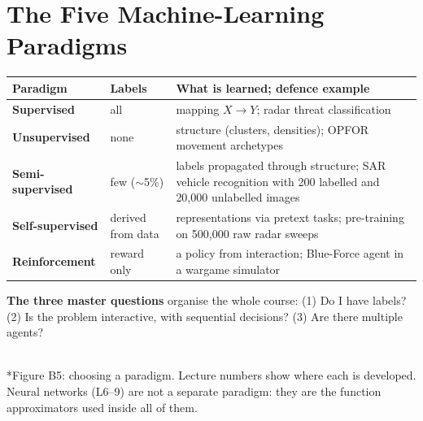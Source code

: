 \documentclass[11pt]{article}
\begin{document}
\section{The Five Machine-Learning Paradigms}
\begin{center}\small\renewcommand{\arraystretch}{1.3}
\begin{tabularx}{\textwidth}{>{\bfseries}l l X}\toprule Paradigm & Labels & What is learned; defence example\\\midrule
Supervised & all & mapping $X\to Y$; radar threat classification\\
Unsupervised & none & structure (clusters, densities); OPFOR movement archetypes\\
Semi-supervised & few ($\sim$5\%) & labels propagated through structure; SAR vehicle recognition with 200 labelled and 20,000 unlabelled images\\
Self-supervised & derived from data & representations via pretext tasks; pre-training on 500,000 raw radar sweeps\\
Reinforcement & reward only & a policy from interaction; Blue-Force agent in a wargame simulator\\\bottomrule
\end{tabularx}\end{center}
\textbf{The three master questions} organise the whole course: (1) Do I have labels? (2) Is the problem interactive, with sequential decisions? (3) Are there multiple agents?
\begin{center}\\*{\small\color{GreyN}Figure B5: choosing a paradigm. Lecture numbers show where each is developed. Neural networks (L6--9) are not a separate paradigm: they are the function approximators used inside all of them.}\end{center}
\end{document}
